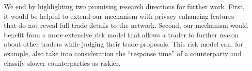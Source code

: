 We end by highlighting two promising research directions for further work.
First, it would be helpful to extend our mechanism with privacy-enhancing features that do not reveal full trade details to the network.
Second, our mechanism would benefit from a more extensive risk model that allows a trader to further reason about other traders while judging their trade proposals.
This risk model can, for example, also take into consideration the \enquote{response time} of a counterparty and classify slower counterparties as riskier.